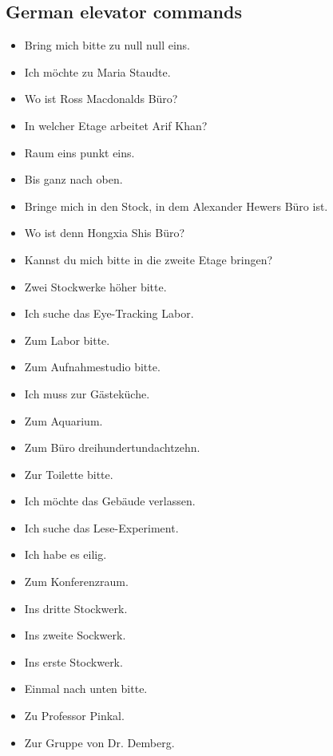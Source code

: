 \documentclass[a4paper, 12pt]{article}
\begin{document}
\begin{appendix}
\subsection{German elevator commands}
\begin{itemize}
\item Bring mich bitte zu null null eins.
\item Ich möchte zu Maria Staudte.
\item Wo ist Ross Macdonalds Büro?
\item In welcher Etage arbeitet Arif Khan?
\item Raum eins punkt eins.
\item Bis ganz nach oben.
\item Bringe mich in den Stock, in dem Alexander Hewers Büro ist.
\item Wo ist denn Hongxia Shis Büro?
\item Kannst du mich bitte in die zweite Etage bringen?
\item Zwei Stockwerke höher bitte.
\item Ich suche das Eye-Tracking Labor.
\item Zum Labor bitte.
\item Zum Aufnahmestudio bitte.
\item Ich muss zur Gästeküche.
\item Zum Aquarium.
\item Zum Büro dreihundertundachtzehn.
\item Zur Toilette bitte.
\item Ich möchte das Gebäude verlassen.
\item Ich suche das Lese-Experiment.
\item Ich habe es eilig.
\item Zum Konferenzraum.
\item Ins dritte Stockwerk.
\item Ins zweite Sockwerk.
\item Ins erste Stockwerk.
\item Einmal nach unten bitte.
\item Zu Professor Pinkal.
\item Zur Gruppe von Dr. Demberg.
\end{itemize}


\end{appendix}
\end{document}
